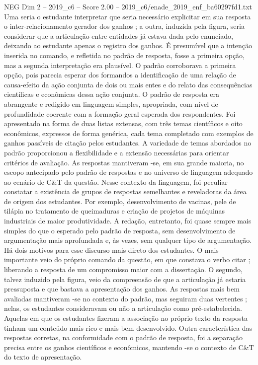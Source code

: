 \begin{textsample}{NEG Dim 2 – 2019\_c6 – Score 2.00 – 2019\_c6/enade\_2019\_enf\_ba60297fd1.txt}
Uma seria o estudante interpretar que seria necessário explicitar em sua resposta o inter-relacionamento gerador dos ganhos ; a outra, induzida pela figura, seria considerar que a articulação entre entidades já estava dada pelo enunciado, deixando ao estudante apenas o registro dos ganhos.
É presumível que a intenção inserida no comando, e refletida no padrão de resposta, fosse a primeira opção, mas a segunda interpretação era plausível.
O padrão corroborava a primeira opção, pois parecia esperar dos formandos a identificação de uma relação de causa-efeito da ação conjunta de dois ou mais entes e do relato das consequências científicas e econômicas dessa ação conjunta.
O padrão de resposta era abrangente e redigido em linguagem simples, apropriada, com nível de profundidade coerente com a formação geral esperada dos respondentes.
Foi apresentado na forma de duas listas extensas, com três temas científicos e oito econômicos, expressos de forma genérica, cada tema completado com exemplos de ganhos passíveis de citação pelos estudantes.
A variedade de temas abordados no padrão proporcionou a flexibilidade e a extensão necessárias para orientar critérios de avaliação.
As respostas mantiveram -se, em sua grande maioria, no escopo antecipado pelo padrão de respostas e no universo de linguagem adequado ao cenário de C\&T da questão.
Nesse contexto da linguagem, foi peculiar constatar a existência de grupos de respostas semelhantes e reveladoras da área de origem dos estudantes.
Por exemplo, desenvolvimento de vacinas, pele de tilápia no tratamento de queimaduras e criação de projetos de máquinas industriais de maior produtividade.
A redação, entretanto, foi quase sempre mais simples do que o esperado pelo padrão de resposta, sem desenvolvimento de argumentação mais aprofundada e, às vezes, sem qualquer tipo de argumentação.
Há dois motivos para esse discurso mais direto dos estudantes.
O mais importante veio do próprio comando da questão, em que constava o verbo citar ; liberando a resposta de um compromisso maior com a dissertação.
O segundo, talvez induzido pela figura, veio da compreensão de que a articulação já estaria pressuposta e que bastava a apresentação dos ganhos.
As respostas mais bem avaliadas mantiveram -se no contexto do padrão, mas seguiram duas vertentes ; nelas, os estudantes consideravam ou não a articulação como pré-estabelecida.
Aquelas em que os estudantes fizeram a associação no próprio texto da resposta tinham um conteúdo mais rico e mais bem desenvolvido.
Outra característica das respostas corretas, na conformidade com o padrão de resposta, foi a separação precisa entre os ganhos científicos e econômicos, mantendo -se o contexto de C\&T do texto de apresentação.

\end{textsample}
